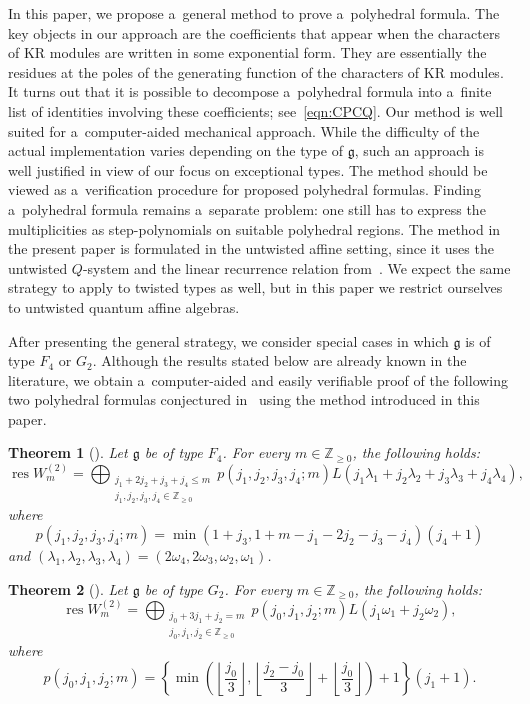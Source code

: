 \documentclass[pdftex]{sigma}
\numberwithin{equation}{section}
\newtheorem{Theorem}{Theorem}[section]
\theoremstyle{definition}
\newcommand{\Z}{\mathbb{Z}}
\newcommand{\g}{\mathfrak{g}}
\newcommand{\res}{\operatorname{res}}
\newcommand\la{\lambda}
\begin{document}
In this paper, we propose a~general method to prove a~polyhedral formula. The key objects in our approach are the coefficients that appear when the characters of KR modules are written in some exponential form.
They are essentially the residues at the poles of the generating function of the characters of KR modules.
It turns out that it is possible to decompose a~polyhedral formula into a~finite list of identities involving these coefficients; see~\eqref{eqn:CPCQ}.
Our method is well suited for a~computer-aided mechanical approach.
While the difficulty of the actual implementation varies depending on the type of $\g$, such an approach is well justified in view of our focus on exceptional types.
The method should be viewed as a~verification procedure for proposed polyhedral formulas.
Finding a~polyhedral formula remains a~separate problem: one still has to express the multiplicities as step-polynomials on suitable polyhedral regions.
The method in the present paper is formulated in the untwisted affine setting, since it uses the untwisted $Q$-system and the linear recurrence relation from~\cite{MR3948941}.
We expect the same strategy to apply to twisted types as well, but in this paper we restrict ourselves to untwisted quantum affine algebras.

After presenting the general strategy, we consider special cases in which $\g$ is of type $F_4$ or $G_2$.
Although the results stated below are already known in the literature, we obtain a~computer-aided and easily verifiable proof of the following two polyhedral formulas conjectured in~\cite{MR1745263} using the method introduced in this paper.
\begin{Theorem}[\cite{MR4114424}]\label{thm:main}
Let $\g$ be of type $F_4$. For every $m\in \Z_{\geq 0}$, the following holds:
\begin{equation}\label{eqn:sumef}
\res W^{(2)}_m =
\bigoplus_{
	\substack{
		j_1 + 2 j_2 + j_3 + j_4 \le m\\
		j_1,j_2,j_3,j_4 \in \Z_{\geq 0}
	}}
 p(j_1,j_2,j_3,j_4;m) L\left(j_1\la_1 +j_2\la_2 +j_3 \la_3 + j_4 \la_4 \right),
\end{equation}
where
\[
p(j_1,j_2,j_3,j_4;m)=\min \left( 1+j_3,1+m-j_1-2 j_2-j_3-j_4 \right) (j_4+1)
\]
and
$(\la_1,\la_2,\la_3,\la_4)=(2\omega_4,2\omega_3,\omega_2,\omega_1)$.
\end{Theorem}

\begin{Theorem}[\cite{MR2238884}]\label{thm:main2}
Let $\g$ be of type $G_2$. For every $m\in \Z_{\geq 0}$, the following holds:
\begin{equation}\label{eqn:sumeg}
\res W^{(2)}_m =
\bigoplus_{
	\substack{
		j_0+3j_1 + j_2 = m\\
		j_0,j_1,j_2 \in \Z_{\geq 0}
	}}
 p(j_0,j_1,j_2;m) L (j_1\omega_1 +j_2\omega_2 ),
\end{equation}
where
\begin{equation}\label{eqn:step-poly}
p(j_0,j_1,j_2;m)=\left\{
\min\left(
	\left\lfloor \frac{j_0}{3} \right\rfloor,
	\left\lfloor \frac{j_2-j_0}{3} \right\rfloor + \left\lfloor \frac{j_0}{3} \right\rfloor
	\right)
+1 \right\}( j_1+1 ).
\end{equation}
\end{Theorem}
\end{document}
